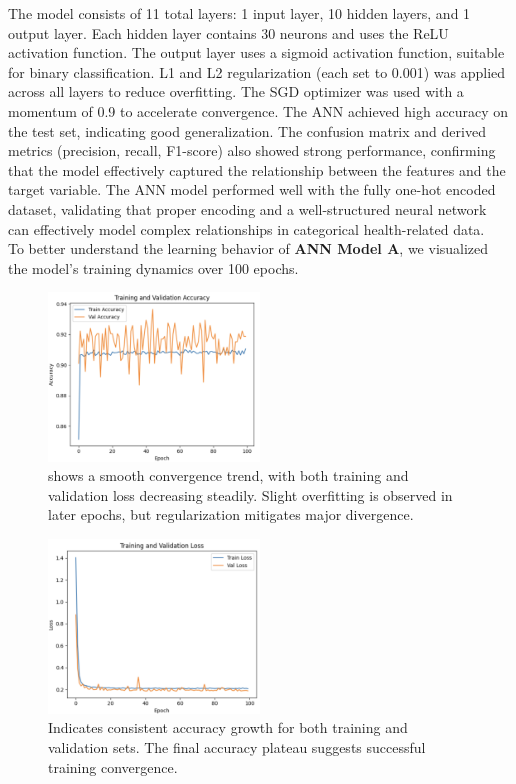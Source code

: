 \documentclass[conference]{IEEEtran}
\begin{document}
The model consists of 11 total layers: 1 input layer, 10 hidden layers, and 1 output layer. Each hidden layer contains 30 neurons and uses the ReLU activation function. The output layer uses a sigmoid activation function, suitable for binary classification. L1 and L2 regularization (each set to 0.001) was applied across all layers to reduce overfitting. The SGD optimizer was used with a momentum of 0.9 to accelerate convergence. The ANN achieved high accuracy on the test set, indicating good generalization. The confusion matrix and derived metrics (precision, recall, F1-score) also showed strong performance, confirming that the model effectively captured the relationship between the features and the target variable. The ANN model performed well with the fully one-hot encoded dataset, validating that proper encoding and a well-structured neural network can effectively model complex relationships in categorical health-related data.\\

To better understand the learning behavior of \textbf{ANN Model A}, we visualized the model’s training dynamics over 100 epochs.\\

\begin{figure}[H]
  \includegraphics[width=0.5\textwidth]{training_accuracy_ANN_A.png} %
  \caption {shows a smooth convergence trend, with both training and validation loss decreasing steadily. Slight overfitting is observed in later epochs, but regularization mitigates major divergence.}
  \label{fig:my_label}
\end{figure}

\begin{figure}[H]
  \includegraphics[width=0.5\textwidth]{training_loss_ANN_A.png} %
  \caption {Indicates consistent accuracy growth for both training and validation sets. The final accuracy plateau suggests successful training convergence.}
  \label{fig:my_label}
\end{figure}
\\
\end{document}
